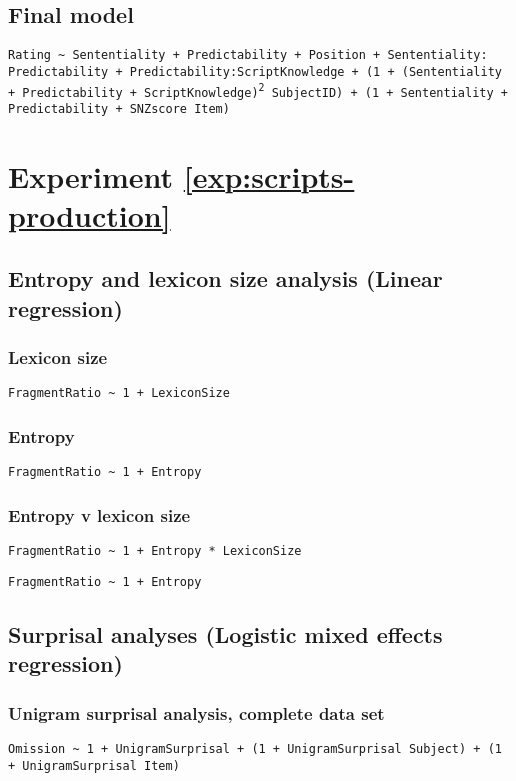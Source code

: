 \subsection*{Final model}
\texttt{Rating \textasciitilde {} Sententiality + Predictability + Position + Sententiality: Predictability + Predictability:ScriptKnowledge + (1 + (Sententiality + Predictability + ScriptKnowledge)\textsuperscript{2}  {}\textbar {} SubjectID) + (1 + Sententiality + Predictability + SNZscore  {}\textbar {} Item)}


\section*{Experiment \ref{exp:scripts-production}}

\subsection*{Entropy and lexicon size analysis  (Linear regression)}
\subsubsection*{Lexicon size}
\texttt{FragmentRatio \textasciitilde {} 1 + LexiconSize}

\subsubsection*{Entropy}
\texttt{FragmentRatio \textasciitilde {} 1 + Entropy}


\subsubsection*{Entropy v lexicon size}
\texttt{FragmentRatio \textasciitilde {} 1 + Entropy * LexiconSize}

\texttt{FragmentRatio \textasciitilde {} 1 + Entropy}

\subsection*{Surprisal analyses (Logistic mixed effects regression)}
\subsubsection*{Unigram surprisal analysis, complete data set}
\texttt{Omission \textasciitilde {} 1 + UnigramSurprisal + (1 + UnigramSurprisal  {}\textbar {} Subject) + (1 + UnigramSurprisal  {}\textbar {} Item)}

